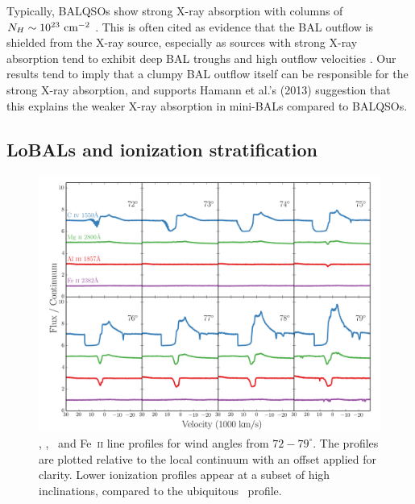 \documentclass[preprint, a4paper, 11pt]{aastex}
\begin{document}
Typically, BALQSOs show strong X-ray absorption with columns 
of $N_H\sim10^{23}~\rm{cm^{-2}}$ 
\citep{green1996,mathur2000,green2001,grupemathur2003}.
This is often cited as evidence that the BAL outflow is shielded from
the X-ray source, especially as sources with strong X-ray absorption tend
to exhibit deep BAL troughs and high outflow velocities 
\citep{brandt2000,laorbrandt2002,gallagher2006}.
Our results tend to imply that a clumpy BAL outflow
itself can be responsible for the strong X-ray absorption, 
and supports Hamann et al.'s (2013) suggestion that 
this explains the weaker X-ray absorption in mini-BALs 
compared to BALQSOs.




\subsection{LoBALs and ionization stratification}

\begin{figure} %
\centering
\includegraphics[width=1.0\textwidth]{figures/c4_angles.png}
\caption
{
\civ , \mg , \al\ and Fe~\textsc{ii} line profiles for wind angles
from $72-79^\circ$. The profiles are plotted relative to the local
continuum with an offset applied for clarity. Lower ionization
profiles appear at a subset of high inclinations, compared
to the ubiquitous \civ\ profile.
}
\label{fig:lobal}
\end{figure} %
\end{document}
